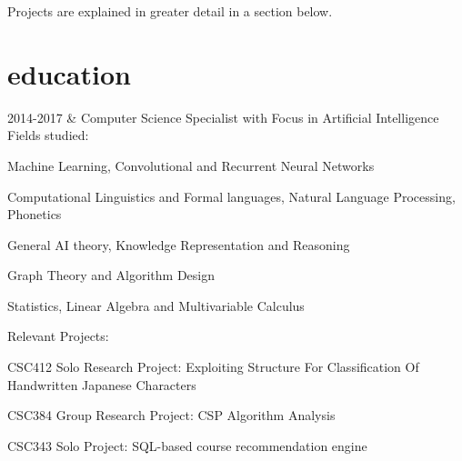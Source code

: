 \documentclass[]{cv-roald}
\begin{document}
Projects are explained in greater detail in a section below.

\section*{education}
\begin{tabularcv}
    2014-2017   &   
                    \newline Computer Science Specialist with Focus in Artificial Intelligence
                    \newline Fields studied:
                    \begin{tabitemize}
                        \item Machine Learning, Convolutional and Recurrent Neural Networks
                        \item Computational Linguistics and Formal languages, Natural Language Processing, Phonetics
                        \item General AI theory, Knowledge Representation and Reasoning 
                        \item Graph Theory and Algorithm Design
                        \item Statistics, Linear Algebra and Multivariable Calculus\newline
                    \end{tabitemize}
                    Relevant Projects:
                    \begin{tabitemize}
                        \item CSC412 Solo Research Project: Exploiting Structure For Classification Of Handwritten Japanese Characters
                        \item CSC384 Group Research Project: CSP Algorithm Analysis
                        \item CSC343 Solo Project: SQL-based course recommendation engine
                    \end{tabitemize}
                    \\[\vspacepar] %
                    

\end{tabularcv}
\end{document}
